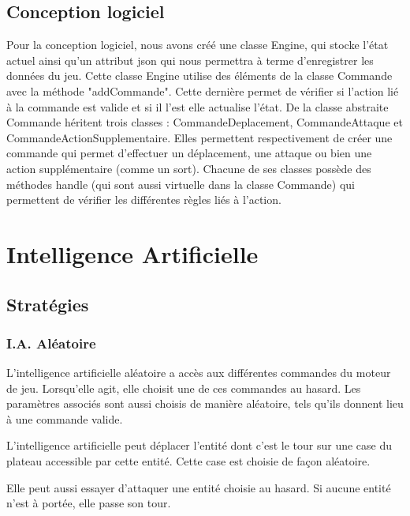 \documentclass[a4paper,12pt]{article}
\begin{document}
\subsection{Conception logiciel}
Pour la conception logiciel, nous avons créé une classe Engine, qui stocke l'état actuel ainsi qu'un attribut json qui nous permettra à terme d'enregistrer les données du jeu. Cette classe Engine utilise des éléments de la classe Commande avec la méthode "addCommande". Cette dernière permet de vérifier si l'action lié à la commande est valide et si il l'est elle actualise l'état. De la classe abstraite Commande héritent trois classes : CommandeDeplacement, CommandeAttaque et CommandeActionSupplementaire. Elles permettent respectivement de créer une commande qui permet d'effectuer un déplacement, une attaque ou bien une action supplémentaire (comme un sort). Chacune de ses classes possède des méthodes handle (qui sont aussi virtuelle dans la classe Commande) qui permettent de vérifier les différentes règles liés à l'action.


\clearpage
\section{Intelligence Artificielle}


\subsection{Stratégies}
\subsubsection{I.A. Aléatoire}
L'intelligence artificielle aléatoire a accès aux différentes commandes du moteur de jeu. Lorsqu'elle agit, elle choisit une de ces commandes au hasard. Les paramètres associés sont aussi choisis de manière aléatoire, tels qu'ils donnent lieu à une commande valide.

L'intelligence artificielle peut déplacer l'entité dont c'est le tour sur une case du plateau accessible par cette entité. Cette case est choisie de façon aléatoire.

Elle peut aussi essayer d'attaquer une entité choisie au hasard. Si aucune entité n'est à portée, elle passe son tour.
\end{document}
